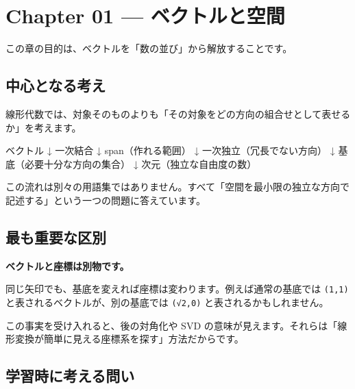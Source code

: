 \documentclass[
  11pt,
  a4paper,
]{ltjsarticle}
\author{}
\date{}
\newenvironment{Shaded}{}{}
\newcommand{\NormalTok}[1]{#1}
\begin{document}
\hypertarget{chapter-01-ux30d9ux30afux30c8ux30ebux3068ux7a7aux9593}{%
\section{Chapter 01 ---
ベクトルと空間}\label{chapter-01-ux30d9ux30afux30c8ux30ebux3068ux7a7aux9593}}

この章の目的は、ベクトルを「数の並び」から解放することです。

\hypertarget{ux4e2dux5fc3ux3068ux306aux308bux8003ux3048}{%
\subsection{中心となる考え}\label{ux4e2dux5fc3ux3068ux306aux308bux8003ux3048}}

線形代数では、対象そのものよりも「その対象をどの方向の組合せとして表せるか」を考えます。

\begin{Shaded}
\begin{Highlighting}[]
\NormalTok{ベクトル}
\NormalTok{ ↓}
\NormalTok{一次結合}
\NormalTok{ ↓}
\NormalTok{span（作れる範囲）}
\NormalTok{ ↓}
\NormalTok{一次独立（冗長でない方向）}
\NormalTok{ ↓}
\NormalTok{基底（必要十分な方向の集合）}
\NormalTok{ ↓}
\NormalTok{次元（独立な自由度の数）}
\end{Highlighting}
\end{Shaded}

この流れは別々の用語集ではありません。すべて「空間を最小限の独立な方向で記述する」という一つの問題に答えています。

\hypertarget{ux6700ux3082ux91cdux8981ux306aux533aux5225}{%
\subsection{最も重要な区別}\label{ux6700ux3082ux91cdux8981ux306aux533aux5225}}

\textbf{ベクトルと座標は別物です。}

同じ矢印でも、基底を変えれば座標は変わります。例えば通常の基底では
\texttt{(1,1)} と表されるベクトルが、別の基底では \texttt{(√2,0)}
と表されるかもしれません。

この事実を受け入れると、後の対角化や SVD
の意味が見えます。それらは「線形変換が簡単に見える座標系を探す」方法だからです。

\hypertarget{ux5b66ux7fd2ux6642ux306bux8003ux3048ux308bux554fux3044}{%
\subsection{学習時に考える問い}\label{ux5b66ux7fd2ux6642ux306bux8003ux3048ux308bux554fux3044}}
\end{document}
